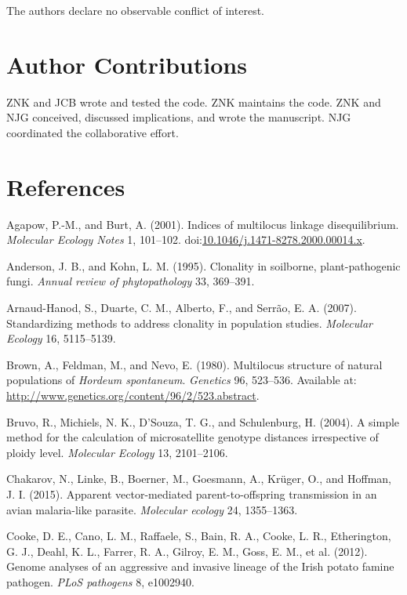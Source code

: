 \documentclass{frontiersSCNS} %
\begin{document}
The authors declare no observable conflict of interest.

\section*{Author Contributions}\label{author-contributions}

ZNK and JCB wrote and tested the code. ZNK maintains the code. ZNK and
NJG conceived, discussed implications, and wrote the manuscript. NJG
coordinated the collaborative effort.


\section*{References}\label{references}

Agapow, P.-M., and Burt, A. (2001). Indices of multilocus linkage
disequilibrium. \emph{Molecular Ecology Notes} 1, 101--102.
doi:\href{http://dx.doi.org/10.1046/j.1471-8278.2000.00014.x}{10.1046/j.1471-8278.2000.00014.x}.

Anderson, J. B., and Kohn, L. M. (1995). Clonality in soilborne,
plant-pathogenic fungi. \emph{Annual review of phytopathology} 33,
369--391.

Arnaud-Hanod, S., Duarte, C. M., Alberto, F., and Serr{\~{a}}o, E. A.
(2007). Standardizing methods to address clonality in population
studies. \emph{Molecular Ecology} 16, 5115--5139.

Brown, A., Feldman, M., and Nevo, E. (1980). Multilocus structure of
natural populations of \emph{Hordeum spontaneum}. \emph{Genetics} 96,
523--536. Available at:
\url{http://www.genetics.org/content/96/2/523.abstract}.

Bruvo, R., Michiels, N. K., D'Souza, T. G., and Schulenburg, H. (2004).
A simple method for the calculation of microsatellite genotype distances
irrespective of ploidy level. \emph{Molecular Ecology} 13, 2101--2106.

Chakarov, N., Linke, B., Boerner, M., Goesmann, A., Kr{\"{u}}ger, O., and
Hoffman, J. I. (2015). Apparent vector-mediated parent-to-offspring
transmission in an avian malaria-like parasite. \emph{Molecular ecology}
24, 1355--1363.

Cooke, D. E., Cano, L. M., Raffaele, S., Bain, R. A., Cooke, L. R.,
Etherington, G. J., Deahl, K. L., Farrer, R. A., Gilroy, E. M., Goss, E.
M., et al. (2012). Genome analyses of an aggressive and invasive lineage
of the Irish potato famine pathogen. \emph{PLoS pathogens} 8, e1002940.
\end{document}

